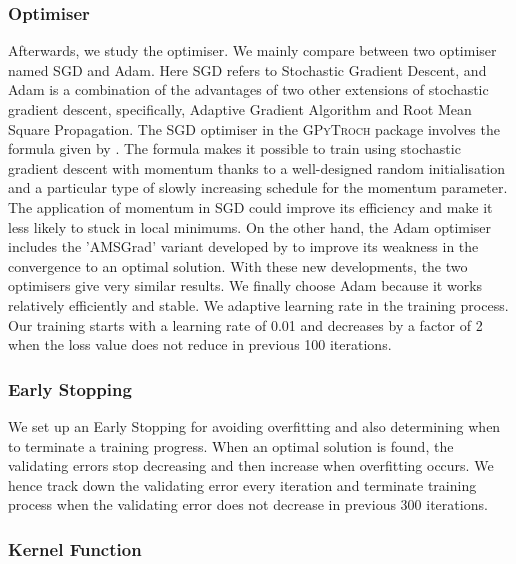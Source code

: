\subsubsection{Optimiser}

Afterwards, we study the optimiser. We mainly compare between two optimiser named SGD and Adam. Here SGD refers to Stochastic Gradient Descent, and Adam is a combination of the advantages of two other extensions of stochastic gradient descent, specifically, Adaptive Gradient Algorithm and Root Mean Square Propagation. 
%
The SGD optimiser in the \textsc{GPyTroch} package involves the formula given by \citet{sutskever2013importance}. The formula makes it possible to train using stochastic gradient descent with momentum thanks to a well-designed random initialisation and a particular type of slowly increasing schedule for the momentum parameter. The application of momentum in SGD could improve its efficiency and make it less likely to stuck in local minimums. On the other hand, the Adam optimiser includes the 'AMSGrad' variant developed by \citet{47409} to improve its weakness in the convergence to an optimal solution. With these new developments, the two optimisers give very similar results. We finally choose Adam because it works relatively efficiently and stable.  
%
We adaptive learning rate in the training process. Our training starts with a learning rate of 0.01 and decreases by a factor of 2 when the loss value does not reduce in previous 100 iterations.    

\subsubsection{Early Stopping}

We set up an Early Stopping for avoiding overfitting and also determining when to terminate a training progress. 
When an optimal solution is found, the validating errors stop decreasing and then increase when overfitting occurs. 
We hence track down the validating error every iteration and terminate training process when the validating error does not decrease in previous 300 iterations. 	

\subsubsection{Kernel Function}

